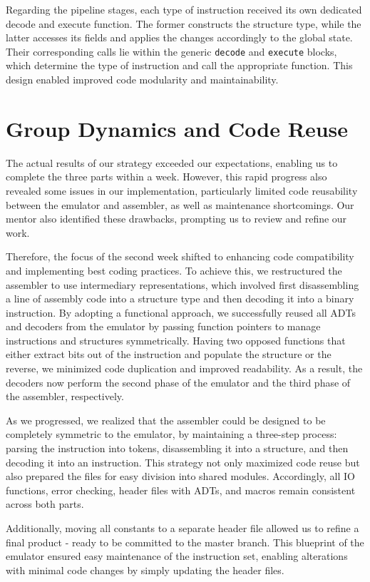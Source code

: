 \documentclass{article}
\begin{document}
Regarding the pipeline stages, each type of instruction received its own dedicated decode and execute function. The former constructs the structure type, while the latter accesses its fields and applies the changes accordingly to the global state. Their corresponding calls lie within the generic \texttt{decode} and \texttt{execute} blocks, which determine the type of instruction and call the appropriate function. This design enabled improved code modularity and maintainability.

\section{Group Dynamics and Code Reuse}

The actual results of our strategy exceeded our expectations, enabling us to complete the three parts within a week. However, this rapid progress also revealed some issues in our implementation, particularly limited code reusability between the emulator and assembler, as well as maintenance shortcomings. Our mentor also identified these drawbacks, prompting us to review and refine our work.

Therefore, the focus of the second week shifted to enhancing code compatibility and implementing best coding practices. To achieve this, we restructured the assembler to use intermediary representations, which involved first disassembling a line of assembly code into a structure type and then decoding it into a binary instruction. By adopting a functional approach, we successfully reused all ADTs and decoders from the emulator by passing function pointers to manage instructions and structures symmetrically. Having two opposed functions that either extract bits out of the instruction and populate the structure or the reverse, we minimized code duplication and improved readability. As a result, the decoders now perform the second phase of the emulator and the third phase of the assembler, respectively. 

As we progressed, we realized that the assembler could be designed to be completely symmetric to the emulator, by maintaining a three-step process: parsing the instruction into tokens, disassembling it into a structure, and then decoding it into an instruction. This strategy not only maximized code reuse but also prepared the files for easy division into shared modules. Accordingly, all IO functions, error checking, header files with ADTs, and macros remain consistent across both parts.

Additionally, moving all constants to a separate header file allowed us to refine a final product - ready to be committed to the master branch. This blueprint of the emulator ensured easy maintenance of the instruction set, enabling alterations with minimal code changes by simply updating the header files.
\end{document}
